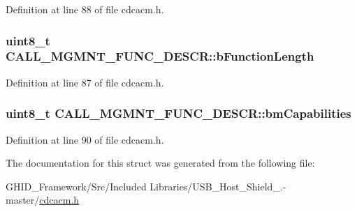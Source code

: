 \-Definition at line 88 of file cdcacm.\-h.

\hypertarget{struct_c_a_l_l___m_g_m_n_t___f_u_n_c___d_e_s_c_r_ae5ab7e23e6f5268f042b1cec3986867a}{
\subsubsection[{b\-Function\-Length}]{\setlength{\rightskip}{0pt plus 5cm}uint8\-\_\-t {\bf \-C\-A\-L\-L\-\_\-\-M\-G\-M\-N\-T\-\_\-\-F\-U\-N\-C\-\_\-\-D\-E\-S\-C\-R\-::b\-Function\-Length}}}\label{struct_c_a_l_l___m_g_m_n_t___f_u_n_c___d_e_s_c_r_ae5ab7e23e6f5268f042b1cec3986867a}


\-Definition at line 87 of file cdcacm.\-h.

\hypertarget{struct_c_a_l_l___m_g_m_n_t___f_u_n_c___d_e_s_c_r_a76161d5fa6c12239aad097f5010825c2}{
\subsubsection[{bm\-Capabilities}]{\setlength{\rightskip}{0pt plus 5cm}uint8\-\_\-t {\bf \-C\-A\-L\-L\-\_\-\-M\-G\-M\-N\-T\-\_\-\-F\-U\-N\-C\-\_\-\-D\-E\-S\-C\-R\-::bm\-Capabilities}}}\label{struct_c_a_l_l___m_g_m_n_t___f_u_n_c___d_e_s_c_r_a76161d5fa6c12239aad097f5010825c2}


\-Definition at line 90 of file cdcacm.\-h.



\-The documentation for this struct was generated from the following file\-:\begin{DoxyCompactItemize}
\item 
\-G\-H\-I\-D\-\_\-\-Framework/\-Src/\-Included Libraries/\-U\-S\-B\-\_\-\-Host\-\_\-\-Shield\-\_.-\/master/\hyperlink{cdcacm_8h}{cdcacm.\-h}\end{DoxyCompactItemize}
